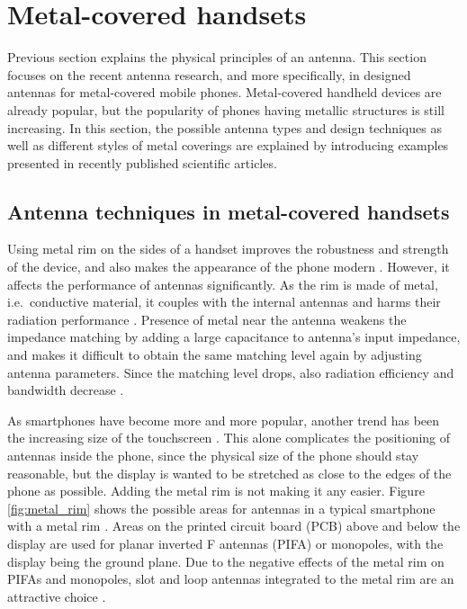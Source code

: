 \section{Metal-covered handsets}
\label{sec:metal_cover}
Previous section explains the physical principles of an antenna. This section focuses on the recent antenna research, and more specifically, in designed antennas for metal-covered mobile phones. Metal-covered handheld devices are already popular, but the popularity of phones having metallic structures is still increasing. In this section, the possible antenna types and design techniques as well as different styles of metal coverings are explained by introducing examples presented in recently published scientific articles.

\subsection{Antenna techniques in metal-covered handsets}
\label{sec:metal_rim}
Using metal rim on the sides of a handset improves the robustness and strength of the device, and also makes the appearance of the phone modern \cite{ban_dual_loop, hsu_compact, yuan_slot}. However, it affects the performance of antennas significantly. As the rim is made of metal, i.e.\ conductive material, it couples with the internal antennas and harms their radiation performance \cite{ban_dual_loop}. Presence of metal near the antenna weakens the impedance matching by adding a large capacitance to antenna's input impedance, and makes it difficult to obtain the same matching level again by adjusting antenna parameters. Since the matching level drops, also radiation efficiency and bandwidth decrease \cite{ban_dual_loop, hsu_compact, yuan_slot}.

As smartphones have become more and more popular, another trend has been the increasing size of the touchscreen \cite{ban_low_profile}. This alone complicates the positioning of antennas inside the phone, since the physical size of the phone should stay reasonable, but the display is wanted to be stretched as close to the edges of the phone as possible. Adding the metal rim is not making it any easier. Figure \ref{fig:metal_rim} shows the possible areas for antennas in a typical smartphone with a metal rim \cite{hsu_compact}. Areas on the printed circuit board (PCB) above and below the display are used for planar inverted F antennas (PIFA) or monopoles, with the display being the ground plane. Due to the negative effects of the metal rim on PIFAs and monopoles, slot and loop antennas integrated to the metal rim are an attractive choice \cite{hsu_compact, ban_dual_loop}.

